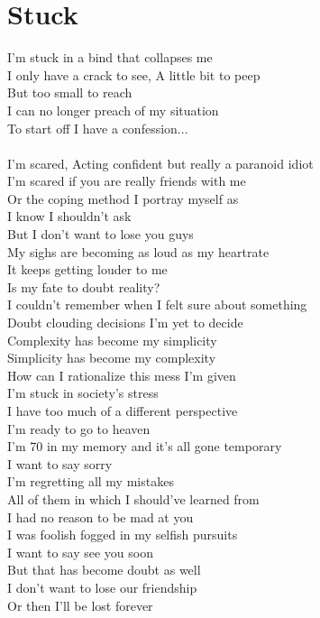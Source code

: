 \documentclass[12pt, b5paper, oneside]{book}
\begin{document}
\section{Stuck}
I'm stuck in a bind that collapses me
\\I only have a crack to see, A little bit to peep
\\But too small to reach
\\I can no longer preach of my situation
\\To start off I have a confession...
%
\\\\I'm scared, Acting confident but really a paranoid idiot
\\I'm scared if you are really friends with me
\\Or the coping method I portray myself as
\\I know I shouldn't ask
\\But I don't want to lose you guys
\\My sighs are becoming as loud as my heartrate
\\It keeps getting louder to me
\\Is my fate to doubt reality?
\\I couldn't remember when I felt sure about something
\\Doubt clouding decisions I'm yet to decide
\\Complexity has become my simplicity
\\Simplicity has become my complexity
\\How can I rationalize this mess I'm given
\\I'm stuck in society's stress
\\I have too much of a different perspective
\\I'm ready to go to heaven
\\I'm 70 in my memory and it's all gone temporary
\\I want to say sorry
\\I'm regretting all my mistakes
\\All of them in which I should've learned from
\\I had no reason to be mad at you
\\I was foolish fogged in my selfish pursuits
\\I want to say see you soon
\\But that has become doubt as well
\\I don't want to lose our friendship
\\Or then I'll be lost forever
\end{document}
